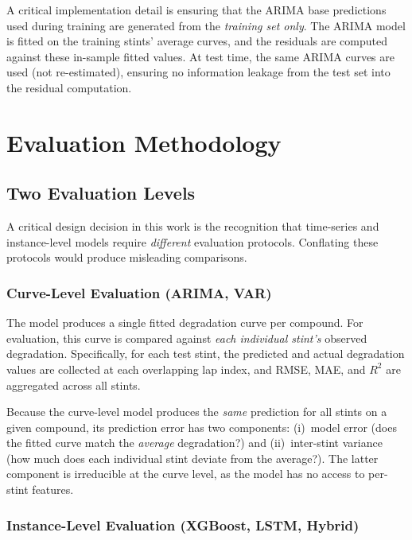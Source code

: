 \documentclass[journal,twoside]{IEEEtran}
\begin{document}
A critical implementation detail is ensuring that the ARIMA base
predictions used during training are generated from the \emph{training
set only}.  The ARIMA model is fitted on the training stints'
average curves, and the residuals are computed against these
in-sample fitted values.  At test time, the same ARIMA curves are
used (not re-estimated), ensuring no information leakage from the test
set into the residual computation.

\section{Evaluation Methodology}\label{sec:eval}

\subsection{Two Evaluation Levels}

A critical design decision in this work is the recognition that
time-series and instance-level models require \emph{different}
evaluation protocols.  Conflating these protocols would produce
misleading comparisons.

\subsubsection{Curve-Level Evaluation (ARIMA, VAR)}

The model produces a single fitted degradation curve per compound.
For evaluation, this curve is compared against \emph{each individual
stint's} observed degradation.  Specifically, for each test stint,
the predicted and actual degradation values are collected at each
overlapping lap index, and RMSE, MAE, and $R^{2}$ are aggregated
across all stints.

Because the curve-level model produces the \textit{same} prediction for
all stints on a given compound, its prediction error has two components:
(i)~model error (does the fitted curve match the \emph{average}
degradation?) and (ii)~inter-stint variance (how much does each
individual stint deviate from the average?).  The latter component is
irreducible at the curve level, as the model has no access to
per-stint features.

\subsubsection{Instance-Level Evaluation (XGBoost, LSTM, Hybrid)}
\end{document}
